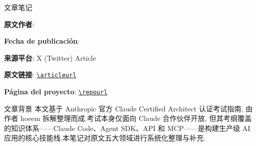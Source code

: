 
\begin{titlepage}
\centering
{\Large 文章笔记\par}
\vspace{1.2cm}
{\huge\bfseries \notetitle\par}
\vspace{0.8cm}
{\large \noteauthors\par}
\vspace{0.3cm}
{\large \notedate\par}
\vspace{2cm}

\begin{tcolorbox}[width=0.9\textwidth, colback=black!2!white, colframe=black!60, sharp corners]
\textbf{原文作者}: \articlechannel\par
\textbf{Fecha de publicación}: \articlepublishdate\par
\textbf{来源平台}: X (Twitter) Article\par
\textbf{原文链接}: \href{\articleurl}{\nolinkurl{\articleurl}}\par
\textbf{Página del proyecto}: \href{\repourl}{\nolinkurl{\repourl}}\par
\end{tcolorbox}

\vfill

\begin{knowledgebox}{文章背景}
本文基于 Anthropic 官方 Claude Certified Architect 认证考试指南, 由作者 hoeem 拆解整理而成.考试本身仅面向 Claude 合作伙伴开放, 但其考纲覆盖的知识体系——Claude Code、Agent SDK、API 和 MCP——是构建生产级 AI 应用的核心技能栈.本笔记对原文五大领域进行系统化整理与补充.
\end{knowledgebox}

\end{titlepage}

\tableofcontents
\newpage


